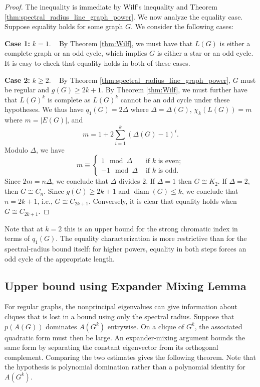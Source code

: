 \documentclass[11pt]{article}
\theoremstyle{plain}
\numberwithin{equation}{section}
\DeclareMathOperator{\diam}{diam}
\begin{document}
\begin{proof} The inequality is immediate by Wilf's inequality and Theorem \ref{thm:spectral_radius_line_graph_power}. We now analyze the equality case. Suppose equality holds for some graph $G$. We consider the following cases:

\textbf{Case 1:} $k=1$. ~ By Theorem \ref{thm:Wilf}, we must have that $L(G)$ is either a complete graph or an odd cycle, which implies $G$ is either a star or an odd cycle. It is easy to check that equality holds in both of these cases. 

\textbf{Case 2:} $k\ge 2$. ~ By Theorem \ref{thm:spectral_radius_line_graph_power}, $G$ must be regular and $g(G)\ge 2k+1$. By Theorem \ref{thm:Wilf}, we must further have that $L(G)^k$ is complete as $L(G)^k$ cannot be an odd cycle under these hypotheses. We thus have $q_1(G) = 2\Delta$ where $\Delta = \Delta(G)$, $\chi_k(L(G)) = m$ where $m = |E(G)|$, and 
\[ m = 1 + 2 \sum_{i=1}^k (\Delta(G)-1)^i. \]
Modulo $\Delta$, we have
\begin{equation}
    m \equiv 
    \begin{cases}
    1 \mod \Delta & \text{ if } k \text{ is even};\\
    -1 \mod \Delta & \text{ if } k \text{ is odd}.
    \end{cases}
\end{equation}
Since $2m = n\Delta$, we conclude that $\Delta$ divides $2$. If $\Delta = 1$ then $G\cong K_2$. If $\Delta = 2$, then $G\cong C_n$. Since $g(G)\ge 2k+1$ and $\diam(G)\le k$, we conclude that $n = 2k+1$, i.e., $G\cong C_{2k+1}$. Conversely, it is clear that equality holds when $G\cong C_{2k+1}$. 
\end{proof}

Note that at $k=2$ this is an upper bound for the strong chromatic index in terms of $q_1(G)$. The equality characterization is more restrictive than for the spectral-radius bound itself: for higher powers, equality in both steps forces an odd cycle of the appropriate length.

\subsection{Upper bound using Expander Mixing Lemma}

For regular graphs, the nonprincipal eigenvalues can give information about cliques that is lost in a bound using only the spectral radius. Suppose that $p(A(G))$ dominates $A(G^k)$ entrywise. On a clique of $G^k$, the associated quadratic form must then be large. An expander-mixing argument bounds the same form by separating the constant eigenvector from its orthogonal complement. Comparing the two estimates gives the following theorem. Note that the hypothesis is polynomial domination rather than a polynomial identity for $A(G^k)$.
\end{document}
